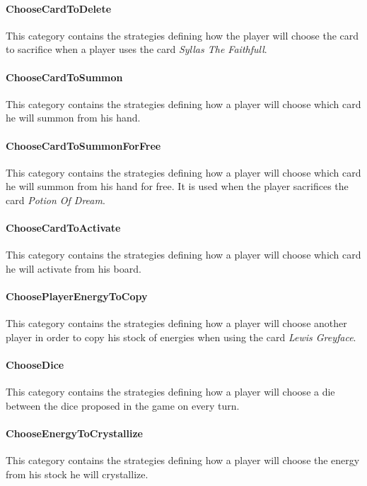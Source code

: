        \paragraph{ChooseCardToDelete}
        This category contains the strategies defining how the player will choose the card to sacrifice when a player uses the card \textit{Syllas The Faithfull}.
        
        \paragraph{ChooseCardToSummon}
        This category contains the strategies defining how a player will choose which card he will summon from his hand.
        
        \paragraph{ChooseCardToSummonForFree}
        This category contains the strategies defining how a player will choose which card he will summon from his hand for free. It is used when the player sacrifices the card \textit{Potion Of Dream}.
        
        \paragraph{ChooseCardToActivate}
        This category contains the strategies defining how a player will choose which card he will activate from his board.
        
        \paragraph{ChoosePlayerEnergyToCopy}
        This category contains the strategies defining how a player will choose another player in order to copy his stock of energies when using the card \textit{Lewis Greyface}. 
        
        \paragraph{ChooseDice}
        This category contains the strategies defining how a player will choose a die between the dice proposed in the game on every turn. 
        
        \paragraph{ChooseEnergyToCrystallize}
        This category contains the strategies defining how a player will choose the energy from his stock he will crystallize.
        
